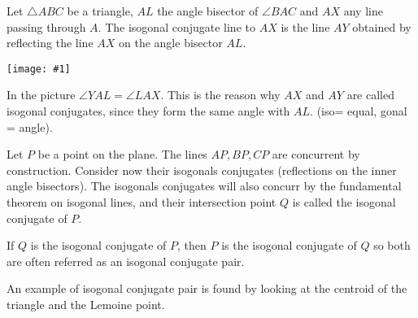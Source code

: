 \documentclass[12pt]{article}
\newcommand{\figura}[1]{\begin{center}\texttt{[image: \#1]}\end{center}}
\begin{document}
Let $\triangle ABC$ be a triangle, $AL$ the angle bisector of $\angle BAC$ and $AX$ any line passing through $A$. The isogonal conjugate line to $AX$ is the line $AY$ obtained by reflecting the line $AX$ on the angle bisector $AL$.

\figura{isogonal.eps}
In the picture $\angle YAL = \angle LAX$. This is the reason why $AX$ and $AY$ are called isogonal conjugates, since they form the same angle with $AL$. (iso= equal, gonal = angle).

Let $P$ be a point on the plane. The lines $AP,BP,CP$ are concurrent by construction. Consider now their isogonals conjugates (reflections on the inner angle bisectors). The isogonals conjugates will also concurr by the   fundamental theorem on isogonal lines, and their intersection point $Q$ is called the isogonal conjugate of $P$. 

If $Q$ is the isogonal conjugate of $P$, then $P$ is the isogonal conjugate of $Q$ so both are often referred as an isogonal conjugate pair.

An example of isogonal conjugate pair is found by looking at the centroid of the triangle and the Lemoine point.
\end{document}
